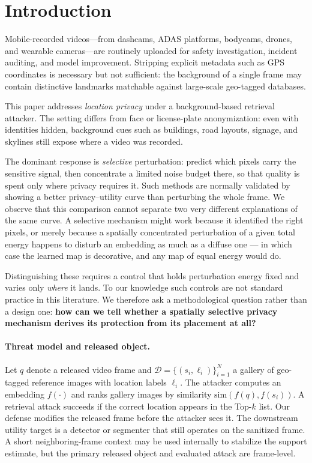 \documentclass[10pt,journal]{IEEEtran}
\begin{document}
\section{Introduction}
Mobile-recorded videos---from dashcams, ADAS platforms, bodycams, drones, and wearable cameras---are routinely uploaded for safety investigation, incident auditing, and model improvement. Stripping explicit metadata such as GPS coordinates is necessary but not sufficient: the background of a single frame may contain distinctive landmarks matchable against large-scale geo-tagged databases.

This paper addresses \emph{location privacy} under a background-based retrieval attacker. The setting differs from face or license-plate anonymization: even with identities hidden, background cues such as buildings, road layouts, signage, and skylines still expose where a video was recorded.

The dominant response is \emph{selective} perturbation: predict which pixels carry the sensitive signal, then concentrate a limited noise budget there, so that quality is spent only where privacy requires it. Such methods are normally validated by showing a better privacy--utility curve than perturbing the whole frame. We observe that this comparison cannot separate two very different explanations of the same curve. A selective mechanism might work because it identified the right pixels, or merely because a spatially concentrated perturbation of a given total energy happens to disturb an embedding as much as a diffuse one --- in which case the learned map is decorative, and any map of equal energy would do.

Distinguishing these requires a control that holds perturbation energy fixed and varies only \emph{where} it lands. To our knowledge such controls are not standard practice in this literature. We therefore ask a methodological question rather than a design one: \textbf{how can we tell whether a spatially selective privacy mechanism derives its protection from its placement at all?}

\paragraph{Threat model and released object.}
Let $q$ denote a released video frame and $\mathcal{D}=\{(s_i,\ell_i)\}_{i=1}^N$ a gallery of geo-tagged reference images with location labels $\ell_i$. The attacker computes an embedding $f(\cdot)$ and ranks gallery images by similarity $\mathrm{sim}(f(q),f(s_i))$. A retrieval attack succeeds if the correct location appears in the Top-$k$ list. Our defense modifies the released frame before the attacker sees it. The downstream utility target is a detector or segmenter that still operates on the sanitized frame. A short neighboring-frame context may be used internally to stabilize the support estimate, but the primary released object and evaluated attack are frame-level.
\end{document}
